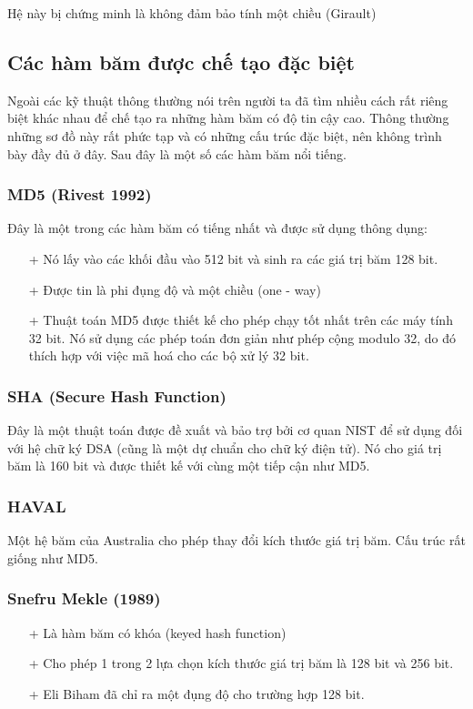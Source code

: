 \documentclass[a4paper,12pt]{report}
\begin{document}
Hệ này bị chứng minh là không đảm bảo tính một chiều (Girault)

\subsection*{Các hàm băm được chế tạo đặc biệt}
Ngoài các kỹ thuật thông thường nói trên người ta đã tìm nhiều cách rất riêng biệt khác nhau để chế tạo ra những hàm băm có độ tin cậy cao. Thông thường những sơ đồ này rất phức tạp và có những cấu trúc đặc biệt, nên không trình bày đầy đủ ở đây. Sau đây là một số các hàm băm nổi tiếng.
\subsubsection{MD5 (Rivest 1992)}
Đây là một trong các hàm băm có tiếng nhất và được sử dụng thông dụng:
\begin{itemize}
\item[+] Nó lấy vào các khối đầu vào 512 bit và sinh ra các giá trị băm 128 bit.
\item[+] Được tin là phi đụng độ và một chiều (one - way)
\item[+] Thuật toán MD5 được thiết kế cho phép chạy tốt nhất trên các máy tính 32 bit. Nó sử dụng các phép toán đơn giản như phép cộng modulo 32, do đó thích hợp với việc mã hoá cho các bộ xử lý 32 bit.
\end{itemize}
\subsubsection{SHA (Secure Hash Function)}
Đây là một thuật toán được đề xuất và bảo trợ bởi cơ quan NIST để sử dụng đối với hệ chữ ký DSA (cũng là một dự chuẩn cho chữ ký điện tử). Nó cho giá trị băm là 160 bit và được thiết kế với cùng một tiếp cận như MD5.
\subsubsection{HAVAL}
Một hệ băm của Australia cho phép thay đổi kích thước giá trị băm. Cấu trúc rất giống như MD5.
\subsubsection{Snefru Mekle (1989)}
\begin{itemize}
\item[+] Là hàm băm có khóa (keyed hash function)
\item[+] Cho phép 1 trong 2 lựa chọn kích thước giá trị băm là 128 bit và 256 bit.
\item[+] Eli Biham đã chỉ ra một đụng độ cho trường hợp 128 bit.
\end{itemize}
\end{document}
